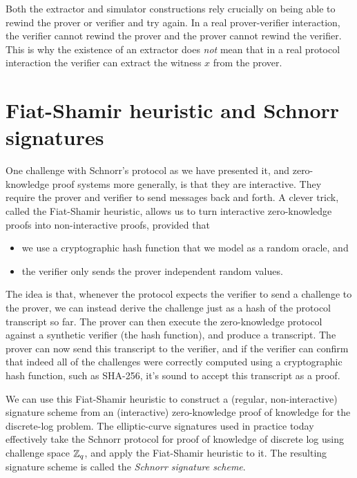 Both the extractor and simulator constructions rely crucially on being
able to rewind the prover or verifier and try again. 
In a real prover-verifier interaction, the verifier cannot rewind the prover
and the prover cannot rewind the verifier.
This is why the existence of an extractor does \emph{not} mean that
in a real protocol interaction the verifier can extract the witness
$x$ from the prover.

\section{Fiat-Shamir heuristic and Schnorr signatures}
\label{sec:hvzk}

One challenge with Schnorr's protocol as we have presented it,
and zero-knowledge proof systems more generally,
is that they are interactive.
They require the prover and verifier to send messages back and forth.
A clever trick, called the Fiat-Shamir heuristic, allows us to turn interactive
zero-knowledge proofs into non-interactive proofs, provided that
\begin{itemize}
\item we use a cryptographic hash function that we model as a random oracle, and
\item the verifier only sends the prover independent random values.
\end{itemize}
The idea is that, whenever the protocol expects the verifier to send a challenge to the
prover, we can instead derive the challenge just as a hash of the protocol transcript so far.
The prover can then execute the zero-knowledge
protocol against a synthetic verifier (the hash function), and produce
a transcript.  The prover can now send this transcript to the verifier,
and if the verifier can confirm that indeed all of the challenges were
correctly computed using a cryptographic hash function, such as 
SHA-256, it's sound to accept this transcript as a proof.

We can use this Fiat-Shamir heuristic to construct a (regular,
non-interactive) signature scheme from an (interactive) zero-knowledge
proof of knowledge for the discrete-log problem.
The elliptic-curve signatures used in practice today
effectively take the Schnorr protocol for proof of knowledge of discrete log
using challenge space $\mathbb{Z}_q$, and apply the Fiat-Shamir heuristic to it.
The resulting signature scheme is called the \emph{Schnorr signature scheme}.

